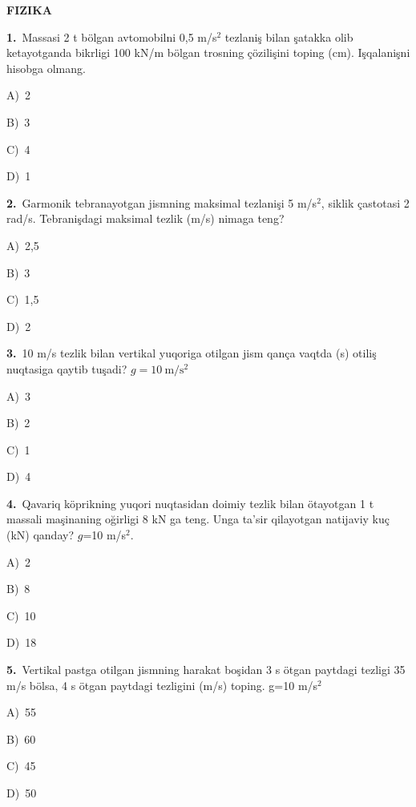 \documentclass[11pt,a4paper]{article}
\newcommand{\opt}[2]{\hspace*{4mm}#1)\ #2\par}
\begin{document}
\begin{center}{\Large\textbf{FIZIKA}}\end{center}
\noindent\begin{minipage}{\linewidth}
\textbf{1.}\ Massasi 2 t bölgan avtomobilni 0,5 m/s$^{2}$ tezlaniş bilan şatakka olib ketayotganda bikrligi 100 kN/m bölgan trosning çözilişini toping (cm). Işqalanişni hisobga olmang.\par\smallskip
\opt{A}{2}
\opt{B}{3}
\opt{C}{4}
\opt{D}{1}
\end{minipage}\vspace{9pt}\par
\noindent\begin{minipage}{\linewidth}
\textbf{2.}\ Garmonik tebranayotgan jismning maksimal tezlanişi 5 m/s$^{2}$, siklik çastotasi 2 rad/s. Tebranişdagi maksimal tezlik (m/s) nimaga teng?\par\smallskip
\opt{A}{2,5}
\opt{B}{3}
\opt{C}{1,5}
\opt{D}{2}
\end{minipage}\vspace{9pt}\par
\noindent\begin{minipage}{\linewidth}
\textbf{3.}\ 10 m/s tezlik bilan vertikal yuqoriga otilgan jism qança vaqtda (s) otiliş nuqtasiga qaytib tuşadi? $g=10\ \mathrm{m/s^2}$\par\smallskip
\opt{A}{3}
\opt{B}{2}
\opt{C}{1}
\opt{D}{4}
\end{minipage}\vspace{9pt}\par
\noindent\begin{minipage}{\linewidth}
\textbf{4.}\ Qavariq köprikning yuqori nuqtasidan doimiy tezlik bilan ötayotgan 1 t massali maşinaning oğirligi 8 kN ga teng. Unga ta’sir qilayotgan natijaviy kuç (kN) qanday? $g$=10 m/s$^{2}$.\par\smallskip
\opt{A}{2}
\opt{B}{8}
\opt{C}{10}
\opt{D}{18}
\end{minipage}\vspace{9pt}\par
\noindent\begin{minipage}{\linewidth}
\textbf{5.}\ Vertikal pastga otilgan jismning harakat boşidan 3 s ötgan paytdagi tezligi 35 m/s bölsa, 4 s ötgan paytdagi tezligini (m/s) toping. g=10 m/s$^{2}$\par\smallskip
\opt{A}{55}
\opt{B}{60}
\opt{C}{45}
\opt{D}{50}
\end{minipage}\vspace{9pt}\par
\end{document}
